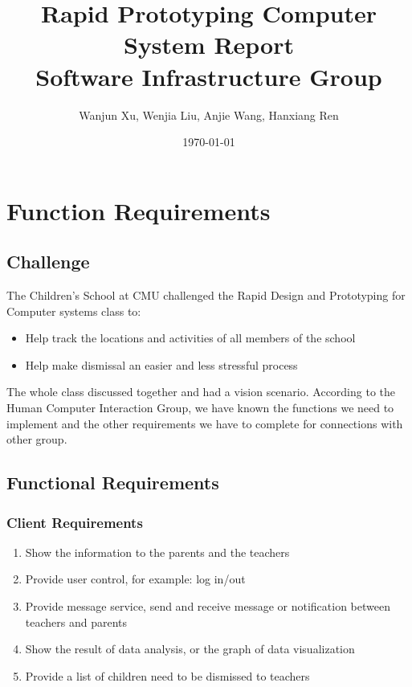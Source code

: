 \documentclass{article}
\begin{document}
\title{Rapid Prototyping Computer System Report\\Software Infrastructure Group}
\author{Wanjun Xu, Wenjia Liu, Anjie Wang, Hanxiang Ren}
\date{\today}
\maketitle

\newpage

\tableofcontents

\newpage

\section{Function Requirements}

\subsection{Challenge}
 The Children’s School at CMU challenged the Rapid Design and Prototyping for Computer systems class to:
\begin{itemize}
	\item Help track the locations and activities of all members of the school 
	\item Help make dismissal an easier and less stressful process 
\end{itemize}

The whole class discussed together and had a vision scenario. According to the Human Computer Interaction Group, we have known the functions we need to implement and the other requirements we have to complete for connections with other group.

\subsection{Functional Requirements}
\subsubsection{Client Requirements}
\begin{enumerate}
	\item Show the information to the parents and the teachers
	\item Provide user control, for example: log in/out
	\item Provide message service, send and receive message or notification between teachers and parents 
	\item Show the result of data analysis, or the graph of data visualization
	\item Provide a list of children need to be dismissed to teachers
\end{enumerate}
\end{document}
